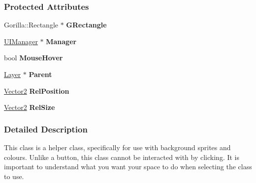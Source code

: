 \subsubsection*{Protected Attributes}
\begin{DoxyCompactItemize}
\item 
\hypertarget{classphys_1_1UI_1_1Rectangle_a2646b0bcc1602757852c21fd70e169cc}{
Gorilla::Rectangle $\ast$ {\bfseries GRectangle}}
\label{classphys_1_1UI_1_1Rectangle_a2646b0bcc1602757852c21fd70e169cc}

\item 
\hypertarget{classphys_1_1UI_1_1Rectangle_a3c78c2e48573d00290f3374e53971a4c}{
\hyperlink{classphys_1_1UIManager}{UIManager} $\ast$ {\bfseries Manager}}
\label{classphys_1_1UI_1_1Rectangle_a3c78c2e48573d00290f3374e53971a4c}

\item 
\hypertarget{classphys_1_1UI_1_1Rectangle_a98b63e58485ebb065c1ad62dc39ac63b}{
bool {\bfseries MouseHover}}
\label{classphys_1_1UI_1_1Rectangle_a98b63e58485ebb065c1ad62dc39ac63b}

\item 
\hypertarget{classphys_1_1UI_1_1Rectangle_ac54c65c81e321d6ba3c58f32af71d407}{
\hyperlink{classphys_1_1UI_1_1Layer}{Layer} $\ast$ {\bfseries Parent}}
\label{classphys_1_1UI_1_1Rectangle_ac54c65c81e321d6ba3c58f32af71d407}

\item 
\hypertarget{classphys_1_1UI_1_1Rectangle_ae059b550f2d6c490f769bcab07b37910}{
\hyperlink{classphys_1_1Vector2}{Vector2} {\bfseries RelPosition}}
\label{classphys_1_1UI_1_1Rectangle_ae059b550f2d6c490f769bcab07b37910}

\item 
\hypertarget{classphys_1_1UI_1_1Rectangle_acac4d6cf1b71363d9c27f900b215667e}{
\hyperlink{classphys_1_1Vector2}{Vector2} {\bfseries RelSize}}
\label{classphys_1_1UI_1_1Rectangle_acac4d6cf1b71363d9c27f900b215667e}

\end{DoxyCompactItemize}


\subsubsection{Detailed Description}
This class is a helper class, specifically for use with background sprites and colours. Unlike a button, this class cannot be interacted with by clicking. It is important to understand what you want your space to do when selecting the class to use. 

